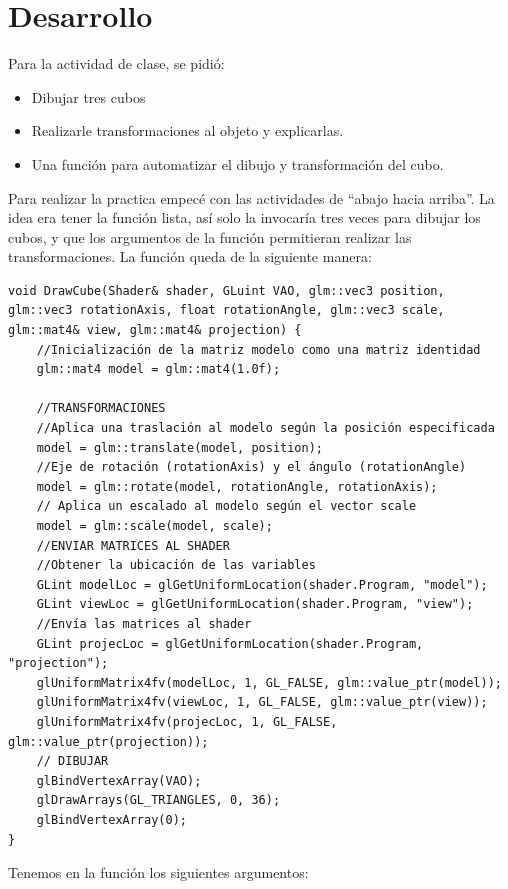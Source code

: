 \documentclass[a4paper,11pt]{article}                 %
\begin{document}
\section{Desarrollo}
Para la actividad de clase, se pidió:
\begin{itemize}
    \item Dibujar tres cubos
    \item Realizarle transformaciones al objeto y explicarlas.
    \item Una función para automatizar el dibujo y transformación del cubo.
\end{itemize}

Para realizar la practica empecé con las actividades de ``abajo hacia arriba''. La idea era tener la función lista, así solo la invocaría tres veces para dibujar los cubos, y que los argumentos de la función permitieran realizar las transformaciones.
La función queda de la siguiente manera:
\begin{lstlisting}[style=cppstyle]
void DrawCube(Shader& shader, GLuint VAO, glm::vec3 position, glm::vec3 rotationAxis, float rotationAngle, glm::vec3 scale, glm::mat4& view, glm::mat4& projection) {
    //Inicialización de la matriz modelo como una matriz identidad
    glm::mat4 model = glm::mat4(1.0f);
    
    //TRANSFORMACIONES
    //Aplica una traslación al modelo según la posición especificada
    model = glm::translate(model, position);
    //Eje de rotación (rotationAxis) y el ángulo (rotationAngle)
    model = glm::rotate(model, rotationAngle, rotationAxis);
    // Aplica un escalado al modelo según el vector scale
    model = glm::scale(model, scale);
    //ENVIAR MATRICES AL SHADER
    //Obtener la ubicación de las variables
    GLint modelLoc = glGetUniformLocation(shader.Program, "model");
    GLint viewLoc = glGetUniformLocation(shader.Program, "view");
    //Envía las matrices al shader 
    GLint projecLoc = glGetUniformLocation(shader.Program, "projection");
    glUniformMatrix4fv(modelLoc, 1, GL_FALSE, glm::value_ptr(model));
    glUniformMatrix4fv(viewLoc, 1, GL_FALSE, glm::value_ptr(view));
    glUniformMatrix4fv(projecLoc, 1, GL_FALSE, glm::value_ptr(projection));
    // DIBUJAR
    glBindVertexArray(VAO);
    glDrawArrays(GL_TRIANGLES, 0, 36);
    glBindVertexArray(0);
}

\end{lstlisting}
Tenemos en la función los siguientes argumentos:
\end{document}
